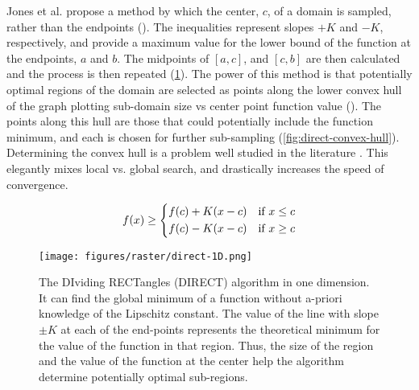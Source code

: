 Jones et al. \cite{jonesLipschitzianOptimizationLipschitz1993} propose a method by which the center, $c$, of a domain is sampled, rather than the endpoints ().
The inequalities represent slopes $+K$ and $-K$, respectively, and provide a maximum value for the lower bound of the function at the endpoints, $a$ and $b$.
The midpoints of $[a,c]$, and $[c,b]$ are then calculated and the process is then repeated (\cref{fig:direct-1D}).
The power of this method is that potentially optimal regions of the domain are selected as points along the lower convex hull of the graph plotting sub-domain size vs center point function value ().
The points along this hull are those that could potentially include the function minimum, and each is chosen for further sub-sampling (\cref{fig:direct-convex-hull}).
Determining the convex hull is a problem well studied in the literature \cite{barberQuickhullAlgorithmConvex1996,chanOptimalOutputsensitiveConvex1996,jarvisIdentificationConvexHull1973,grahamEfficientAlgorithDetermining1972}.
This elegantly mixes local vs. global search, and drastically increases the speed of convergence.


\begin{equation}
    f(x) \ge \begin{dcases}
        f(c) + K(x-c) & \text{if  } x \le c \\
        f(c) - K(x-c) & \text{if  } x \ge c
    \end{dcases}
    \label{eq:direct-lipschitz}
\end{equation}

\begin{figure}[h!]
    \begin{center}
        \texttt{[image: figures/raster/direct-1D.png]}
    \end{center}
    \caption[The DIviding RECTangles (DIRECT) algorithm in one dimension]{The DIviding RECTangles (DIRECT) algorithm in one dimension. It can find the global minimum of a function without a-priori knowledge of the Lipschitz constant. The value of the line with slope $\pm K$ at each of the end-points represents the theoretical minimum for the value of the function in that region. Thus, the size of the region and the value of the function at the center help the algorithm determine potentially optimal sub-regions.}
    \label{fig:direct-1D}
\end{figure}

